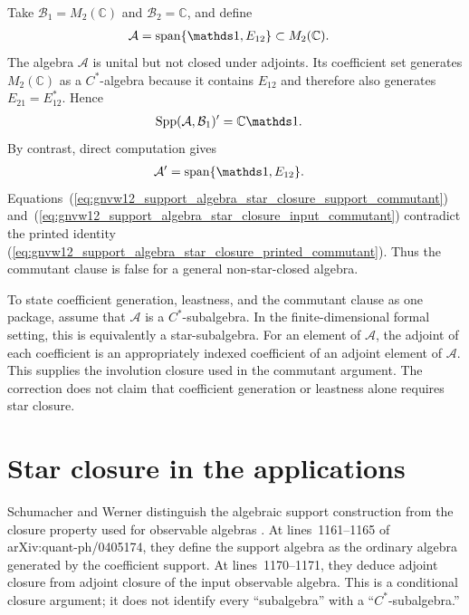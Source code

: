\documentclass[11pt]{article}
\begin{document}
Take $\mathcal B_1=M_2(\mathbb C)$ and $\mathcal B_2=\mathbb C$, and define
\begin{align}
    \mathcal A
        &=\operatorname{span}\{\Id,E_{12}\}
          \subset M_2(\mathbb C).
    \label{eq:gnvw12_support_algebra_star_closure_counterexample_algebra}
\end{align}
The algebra $\mathcal A$ is unital but not closed under adjoints. Its
coefficient set generates $M_2(\mathbb C)$ as a $C^*$-algebra because it
contains $E_{12}$ and therefore also generates $E_{21}=E_{12}^*$. Hence
\begin{align}
    \operatorname{Spp}(\mathcal A,\mathcal B_1)'
        &=\mathbb C\Id.
    \label{eq:gnvw12_support_algebra_star_closure_support_commutant}
\end{align}
By contrast, direct computation gives
\begin{align}
    \mathcal A'
        &=\operatorname{span}\{\Id,E_{12}\}.
    \label{eq:gnvw12_support_algebra_star_closure_input_commutant}
\end{align}
Equations~(\ref{eq:gnvw12_support_algebra_star_closure_support_commutant})
and~(\ref{eq:gnvw12_support_algebra_star_closure_input_commutant}) contradict
the printed identity
(\ref{eq:gnvw12_support_algebra_star_closure_printed_commutant}). Thus the
commutant clause is false for a general non-star-closed algebra.

To state coefficient generation, leastness, and the commutant clause as one
package, assume that $\mathcal A$ is a $C^*$-subalgebra. In the
finite-dimensional formal setting, this is equivalently a star-subalgebra.
For an element of $\mathcal A$, the adjoint of each coefficient is an
appropriately indexed coefficient of an adjoint element of $\mathcal A$.
This supplies the involution closure used in the commutant argument. The
correction does not claim that coefficient generation or leastness alone
requires star closure.

\section{Star closure in the applications}

Schumacher and Werner distinguish the algebraic support construction from the
closure property used for observable algebras
\cite{SchumacherWerner2004QCA}. At lines~1161--1165 of
arXiv:quant-ph/0405174, they define the support algebra as the ordinary
algebra generated by the coefficient support. At lines~1170--1171, they
deduce adjoint closure from adjoint closure of the input observable algebra.
This is a conditional closure argument; it does not identify every
``subalgebra'' with a ``$C^*$-subalgebra.''
\end{document}
